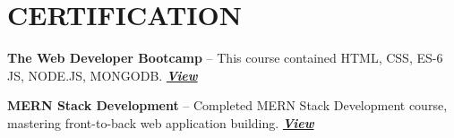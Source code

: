 \section{CERTIFICATION}
\resumeSubHeadingListStart
    \resumeProjectHeading
    {\textbf{The Web Developer Bootcamp } -- This course contained HTML, CSS, ES-6 JS, NODE.JS, MONGODB.}    {\href{https://archive.nptel.ac.in/noc/Ecertificate/?q=NPTEL22CS102S5307011910019355}{\textit{\textbf{View}}}}


    \resumeProjectHeading
    {\textbf{MERN Stack Development} -- Completed MERN Stack Development course, mastering front-to-back web application building.}    {\href{https://courses.cognitiveclass.ai/certificates/94c8ec1c510841e1a5566c4f9f63d39a}{\textit{\textbf{View}}}}
\resumeSubHeadingListEnd